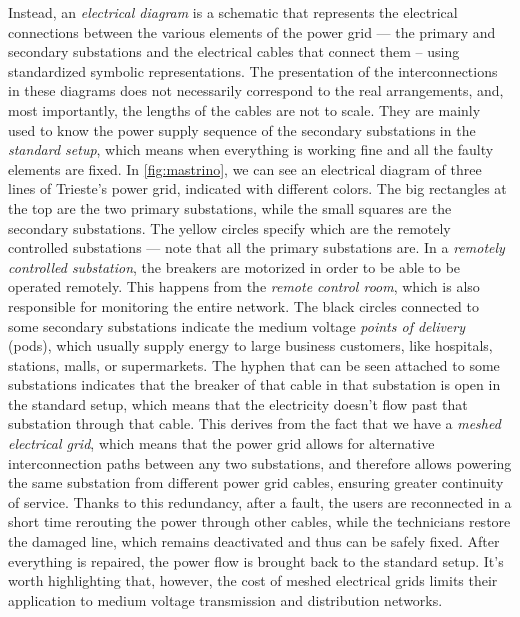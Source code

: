 Instead, an \emph{electrical diagram} is a schematic that represents the electrical connections between the various elements of the power grid --- the primary and secondary substations and the electrical cables that connect them -- using standardized symbolic representations. The presentation of the interconnections in these diagrams does not necessarily correspond to the real arrangements, and, most importantly, the lengths of the cables are not to scale. They are mainly used to know the power supply sequence of the secondary substations in the \emph{standard setup}, which means when everything is working fine and all the faulty elements are fixed.
In \autoref{fig:mastrino}, we can see an electrical diagram of three lines of Trieste's power grid, indicated with different colors. The big rectangles at the top are the two primary substations, while the small squares are the secondary substations. The yellow circles specify which are the remotely controlled substations --- note that all the primary substations are. In a \emph{remotely controlled substation}, the breakers are motorized in order to be able to be operated remotely. This happens from the \emph{remote control room}, which is also responsible for monitoring the entire network. The black circles connected to some secondary substations indicate the medium voltage \emph{points of delivery} (\acrshort{pod}s), which usually supply energy to large business customers, like hospitals, stations, malls, or supermarkets.
The hyphen that can be seen attached to some substations indicates that the breaker of that cable in that substation is open in the standard setup, which means that the electricity doesn't flow past that substation through that cable. This derives from the fact that we have a \emph{meshed electrical grid}, which means that the power grid allows for alternative interconnection paths between any two substations, and therefore allows powering the same substation from different power grid cables, ensuring greater continuity of service. Thanks to this redundancy, after a fault, the users are reconnected in a short time rerouting the power through other cables, while the technicians restore the damaged line, which remains deactivated and thus can be safely fixed.
After everything is repaired, the power flow is brought back to the standard setup. It's worth highlighting that, however, the cost of meshed electrical grids limits their application to medium voltage transmission and distribution networks.


